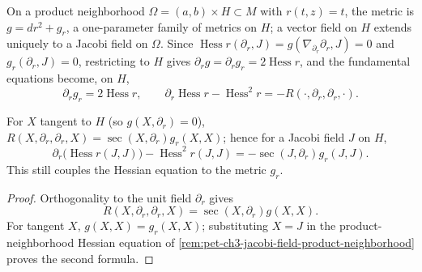 \begin{remark}
  \label{rem:pet-ch3-jacobi-field-product-neighborhood}


  \sketch
  On a product neighborhood $\Omega=(a,b)\times H\subset M$ with $r(t,z)=t$, the
  metric is $g=dr^2+g_r$, a one-parameter family of metrics on $H$; a vector
  field on $H$ extends uniquely to a Jacobi field on $\Omega$. Since
  $\operatorname{Hess}r(\partial_r,J)=g(\nabla_{\partial_r}\partial_r,J)=0$ and
  $g_r(\partial_r,J)=0$, restricting to $H$ gives $\partial_rg=\partial_rg_r=2\operatorname{Hess}r$,
  and the fundamental equations become, on $H$,
  \[
    \partial_rg_r=2\operatorname{Hess}r,\qquad
    \partial_r\operatorname{Hess}r-\operatorname{Hess}^2r=-R(\cdot,\partial_r,\partial_r,\cdot).
  \]
\end{remark}

\begin{lemma}
  \label{lem:pet-ch3-jacobi-field-sectional-curvature-formula}


  For $X$ tangent to $H$ (so $g(X,\partial_r)=0$),
  $R(X,\partial_r,\partial_r,X)=\sec(X,\partial_r)g_r(X,X)$; hence for a Jacobi
  field $J$ on $H$,
  \[
    \partial_r\big(\operatorname{Hess}r(J,J)\big)-\operatorname{Hess}^2r(J,J)=-\sec(J,\partial_r)g_r(J,J).
  \]
  This still couples the Hessian equation to the metric $g_r$.
\end{lemma}
\begin{proof}

  \sketch
  Orthogonality to the unit field $\partial_r$ gives
  \[
   R(X,\partial_r,\partial_r,X)
   =\sec(X,\partial_r)g(X,X).
  \]
  For tangent $X$, $g(X,X)=g_r(X,X)$; substituting $X=J$ in the
  product-neighborhood Hessian equation of
  \cref{rem:pet-ch3-jacobi-field-product-neighborhood} proves the second formula.
\end{proof}


